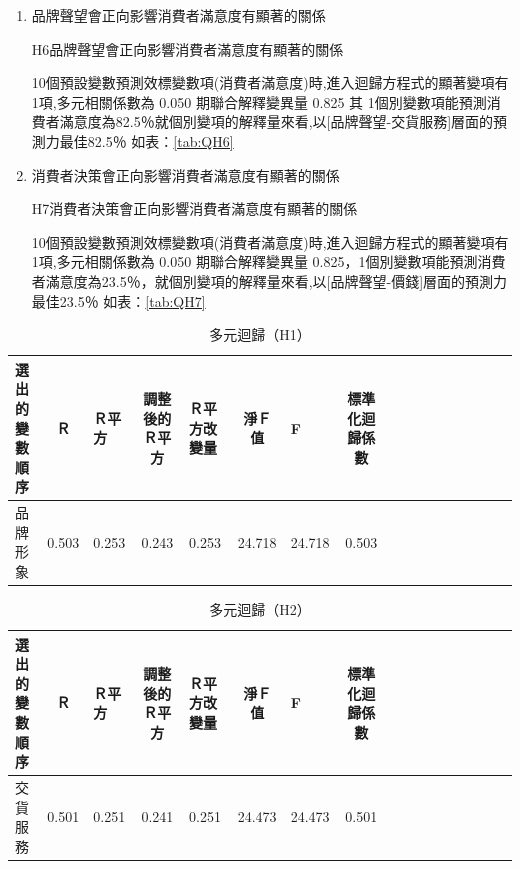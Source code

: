 \begin{enumerate}
\item 品牌聲望會正向影響消費者滿意度有顯著的關係

H6品牌聲望會正向影響消費者滿意度有顯著的關係

10個預設變數預測效標變數項(消費者滿意度)時,進入迴歸方程式的顯著變項有 1項,多元相關係數為 0.050 期聯合解釋變異量 0.825 其 1個別變數項能預測消費者滿意度為82.5％就個別變項的解釋量來看,以[品牌聲望-交貨服務]層面的預測力最佳82.5％ 如表：\ref{tab:QH6}

\item 消費者決策會正向影響消費者滿意度有顯著的關係

H7消費者決策會正向影響消費者滿意度有顯著的關係

10個預設變數預測效標變數項(消費者滿意度)時,進入迴歸方程式的顯著變項有 1項,多元相關係數為 0.050 期聯合解釋變異量 0.825，1個別變數項能預測消費者滿意度為23.5％，就個別變項的解釋量來看,以[品牌聲望-價錢]層面的預測力最佳23.5％ 如表：\ref{tab:QH7}


\end{enumerate}



\begin{table}[H]
\caption{多元迴歸（H1）}
\label{tab:QH1}
\centering
\renewcommand{\arraystretch}{1} %
\arrayrulewidth=1pt               %
\tabcolsep=4pt                   %
\begin{tabular}[t]{lclclclclclclclcl}  %
\hline
選出的變數順序&Ｒ&Ｒ平方&調整後的Ｒ平方&Ｒ平方改變量&淨Ｆ值&F&標準化迴歸係數\\
\hline
品牌形象	&0.503	&0.253	&0.243	&0.253	&24.718	&24.718 &0.503\\
\hline
\end{tabular}
\end{table}


\begin{table}[H]
\caption{多元迴歸（H2）}
\label{tab:QH2}
\centering
\renewcommand{\arraystretch}{1} %
\arrayrulewidth=1pt               %
\tabcolsep=4pt                   %
\begin{tabular}[t]{lclclclclclclclcl}  %
\hline
選出的變數順序&Ｒ&Ｒ平方&調整後的Ｒ平方&Ｒ平方改變量&淨Ｆ值&F&標準化迴歸係數\\
\hline
交貨服務&0.501&0.251&0.241&0.251&24.473&24.473&0.501\\
\hline
\end{tabular}
\end{table}

